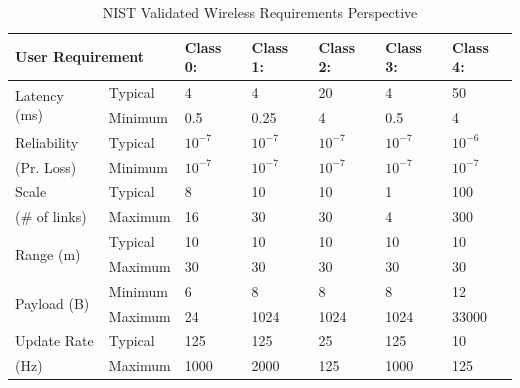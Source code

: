 \begin{table}[!tb]
	\centering
	\caption{NIST Validated Wireless Requirements Perspective}
	\label{soa:nist-reqts-persp}%
	
	\begin{tabular}{|p{5.715em}|p{4.855em}|l|l|l|l|l|}
		\toprule
		\multicolumn{2}{|p{10.57em}|}{\textbf{User Requirement}} & \multicolumn{1}{p{4.355em}|}{\textbf{Class 0:}} & \multicolumn{1}{p{4.355em}|}{\textbf{Class 1:}} & \multicolumn{1}{p{4.355em}|}{\textbf{Class 2:}} & \multicolumn{1}{p{4.355em}|}{\textbf{Class 3:}} & \multicolumn{1}{p{4.355em}|}{\textbf{Class 4:}} \\
		\midrule
		\multirow{2}[4]{*}{Latency (ms)} & Typical & 4     & 4     & 20    & 4     & 50 \\
		\cmidrule{2-7}\multicolumn{1}{|l|}{} & Minimum & 0.5   & 0.25  & 4     & 0.5   & 4 \\
		\midrule
		Reliability & Typical & \multicolumn{1}{p{4.355em}|}{$10^{-7}$} & \multicolumn{1}{p{4.355em}|}{$10^{-7}$} & \multicolumn{1}{p{4.355em}|}{$10^{-7}$} & \multicolumn{1}{p{4.355em}|}{$10^{-7}$} & \multicolumn{1}{p{4.355em}|}{$10^{-6}$} \\
		\cmidrule{2-7}(Pr. Loss) & Minimum & \multicolumn{1}{p{4.355em}|}{$10^{-7}$} & \multicolumn{1}{p{4.355em}|}{$10^{-7}$} & \multicolumn{1}{p{4.355em}|}{$10^{-7}$} & \multicolumn{1}{p{4.355em}|}{$10^{-7}$} & \multicolumn{1}{p{4.355em}|}{$10^{-7}$} \\
		\midrule
		Scale & Typical & 8     & 10    & 10    & 1     & 100 \\
		\cmidrule{2-7}(\# of links) & Maximum & 16    & 30    & 30    & 4     & 300 \\
		\midrule
		\multirow{2}[4]{*}{Range (m)} & Typical & 10    & 10    & 10    & 10    & 10 \\
		\cmidrule{2-7}\multicolumn{1}{|l|}{} & Maximum & 30    & 30    & 30    & 30    & 30 \\
		\midrule
		\multirow{2}[4]{*}{Payload (B)} & Minimum & 6     & 8     & 8     & 8     & 12 \\
		\cmidrule{2-7}\multicolumn{1}{|l|}{} & Maximum  & 24    & 1024  & 1024  & 1024  & 33000 \\
		\midrule
		Update Rate & Typical & 125   & 125   & 25    & 125   & 10 \\
		\cmidrule{2-7}(Hz)  & Maximum & 1000  & 2000  & 125   & 1000  & 125 \\
		\bottomrule
	\end{tabular}%
\end{table}%

